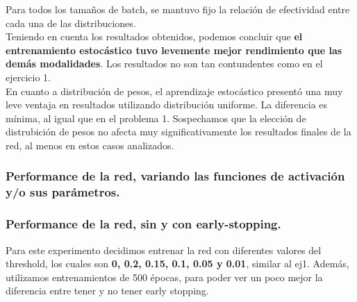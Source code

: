 Para todos los tamaños de batch, se mantuvo fijo la relación de efectividad entre cada una de las distribuciones.\\

Teniendo en cuenta los resultados obtenidos, podemos concluir que \textbf{el entrenamiento estocástico tuvo levemente mejor rendimiento que las demás modalidades}. Los resultados no son tan contundentes como en el ejercicio 1.\\

En cuanto a distribución de pesos, el aprendizaje estocástico presentó una muy leve ventaja en resultados utilizando distribución uniforme. La diferencia es mínima, al igual que en el problema 1. Sospechamos que la elección de distrubición de pesos no afecta muy significativamente los resultados finales de la red, al menos en estos casos analizados.\\

\subsubsection{Performance de la red, variando las funciones de activación y/o sus parámetros.}

\subsubsection{Performance de la red, sin y con early-stopping.}

Para este experimento decidimos entrenar la red con diferentes valores del threshold, los cuales son \textbf{0, 0.2, 0.15, 0.1, 0.05 y 0.01}, similar 
al ej1. Además, utilizamos entrenamientos de 500 épocas, para poder ver un poco mejor la diferencia entre tener y no tener early stopping.

